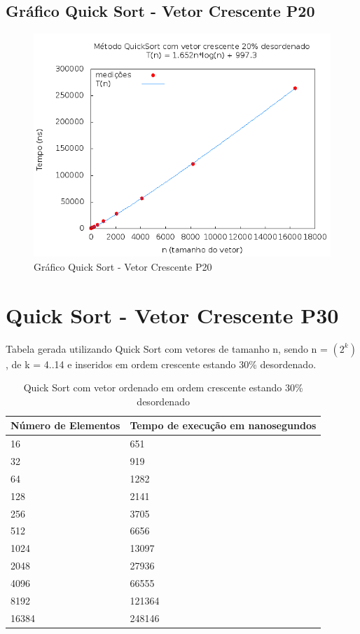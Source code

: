 \documentclass[12pt,a4paper,twoside]{report}
\begin{document}
\subsection{Gráfico Quick Sort - Vetor Crescente P20}
\begin{figure}[H]
    \centering
    \includegraphics[width=0.7\linewidth]{graficos/QuickSort/vIntCrescenteP20/vIntCrescenteP20.png}
  \caption{Gráfico Quick Sort - Vetor Crescente P20}
\end{figure}

\section{Quick Sort - Vetor Crescente P30}
Tabela gerada utilizando Quick Sort com vetores de tamanho n, sendo n = $(2^k)$, de k = 4..14 e inseridos em ordem crescente estando 30\% desordenado.
\begin{table}[H]
\centering
\caption{Quick Sort com vetor ordenado em ordem crescente estando 30\% desordenado}
\label{my-label}
\begin{tabular}{|l|l|}
\hline
\multicolumn{1}{|c|}{\textbf{Número de Elementos}} & \multicolumn{1}{c|}{\textbf{Tempo de execução em nanosegundos}} \\ \hline
16 & 651 \\ \hline
32 & 919 \\ \hline
64 & 1282 \\ \hline
128 & 2141 \\ \hline
256 & 3705 \\ \hline
512 & 6656 \\ \hline
1024 & 13097 \\ \hline
2048 & 27936 \\ \hline
4096 & 66555 \\ \hline
8192 & 121364 \\ \hline
16384 & 248146 \\ \hline
\end{tabular}
\end{table}
\end{document}
